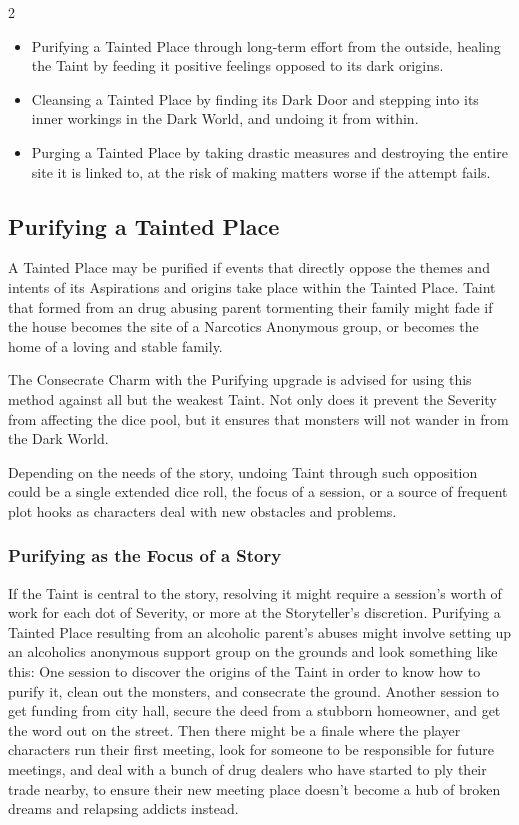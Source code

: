 \begin{multicols}{2}
\begin{itemize}
\item Purifying a Tainted Place through long-term effort from the outside, healing the Taint by feeding it positive feelings opposed to its dark origins.
\item Cleansing a Tainted Place by finding its Dark Door and stepping into its inner workings in the Dark World, and undoing it from within.
\item Purging a Tainted Place by taking drastic measures and destroying the entire site it is linked to, at the risk of making matters worse if the attempt fails.
\end{itemize}

\subsection*{Purifying a Tainted Place}

A Tainted Place may be purified if events that directly oppose the themes and intents of its Aspirations and origins take place within the Tainted Place. Taint that formed from an drug abusing parent tormenting their family might fade if the house becomes the site of a Narcotics Anonymous group, or becomes the home of a loving and stable family. 

The Consecrate Charm with the Purifying upgrade is advised for using this method against all but the weakest Taint. Not only does it prevent the Severity from affecting the dice pool, but it ensures that monsters will not wander in from the Dark World.

Depending on the needs of the story, undoing Taint through such opposition could be a single extended dice roll, the focus of a session, or a source of frequent plot hooks as characters deal with new obstacles and problems. 

\subsubsection*{Purifying as the Focus of a Story}
If the Taint is central to the story, resolving it might require a session’s worth of work for each dot of Severity, or more at the Storyteller’s discretion. Purifying a Tainted Place resulting from an alcoholic parent’s abuses might involve setting up an alcoholics anonymous support group on the grounds and look something like this: One session to discover the origins of the Taint in order to know how to purify it, clean out the monsters, and consecrate the ground. Another session to get funding from city hall, secure the deed from a stubborn homeowner, and get the word out on the street. Then there might be a finale where the player characters run their first meeting, look for someone to be responsible for future meetings, and deal with a bunch of drug dealers who have started to ply their trade nearby, to ensure their new meeting place doesn’t become a hub of broken dreams and relapsing addicts instead.


\end{multicols}
